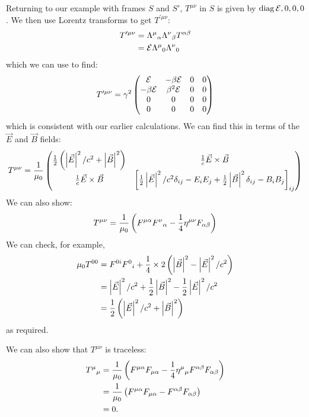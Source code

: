 \documentclass[../Main.tex]{subfiles}
\begin{document}
Returning to our example with frames $S$ and $S'$, $T^{\mu \nu}$ in $S$ is given by $\operatorname{diag}{\mathcal{E}, 0, 0, 0}$. We then use Lorentz transforms to get $T^{\prime\mu\nu}$:
\begin{align*}
    T^{\prime\mu\nu} &= \indx{\Lambda}{\mu}{\alpha} \indx\Lambda\nu\beta T^{\alpha\beta} \\
    &= \E \indx\Lambda\mu0 \indx\Lambda\nu0
\end{align*}
which we can use to find:
\begin{equation*}
    T^{\prime\mu\nu} = \gamma^2
    \begin{pmatrix}
        \mathcal{E} & -\beta\mathcal{E} & 0 & 0 \\
        -\beta\mathcal{E} & \beta^2 \mathcal{E} & 0 & 0 \\
        0 & 0 & 0 & 0 \\
        0 & 0 & 0 & 0
    \end{pmatrix}
\end{equation*}
which is consistent with our earlier calculations. We can find this in terms of the $\vec{E}$ and $\vec{B}$ fields:
\begin{equation*}
    T^{\mu\nu} = \frac{1}{\mu_0}
    \begin{pmatrix}
        \frac12 \left(\left|\vec{E}\right|^2 / c^2 + \left|\vec{B}\right|^2\right) & \frac1c\vec{E} \times \vec{B} \\
        \frac1c \vec{E}\times\vec{B} & \left[\frac12 \left|\vec{E}\right|^2 / c^2 \delta_{ij} - E_i E_j + \frac12 \left|\vec{B}\right|^2 \delta_{ij} - B_i B_j\right]_{ij}
    \end{pmatrix}
\end{equation*}
We can also show:
\begin{equation}
    T^{\mu \nu} = \frac1{\mu_0} \left(F^{\mu\alpha} \indx{F}\nu\alpha - \frac14 \eta^{\mu\nu} F_{\alpha\beta}\right)
    \label{eqnSETens}
\end{equation}
We can check, for example,
\begin{align*}
    \mu_0 T^{00} &= F^{0i} \indx{F}{0}{i} + \frac14 \times 2\left(\abs{\vec{B}}^2 - \abs{\vec{E}}^2 / c^2\right) \\
    &= \abs{\vec{E}}^2 / c^2 + \frac12 \abs{\vec{B}}^2 - \frac12 \abs{\vec{E}}^2 / c^2 \\
    &= \frac12 \left(\abs{\vec{E}}^2 / c^2 + \abs{\vec{B}}^2\right)
\end{align*}
as required.

We can also show that $T^{\mu\nu}$ is traceless:
\begin{align*}
    \indx{T}\mu\mu &= \frac1{\mu_0} \left(F^{\mu\alpha} F_{\mu\alpha} - \frac14 \indx\eta\mu\mu F^{\alpha\beta}F_{\alpha\beta}\right) \\
    &= \frac1{\mu_0} \left(F^{\mu\alpha} F_{\mu\alpha} - F^{\alpha\beta}F_{\alpha\beta}\right) \\
    &= 0.
\end{align*}
\end{document}
